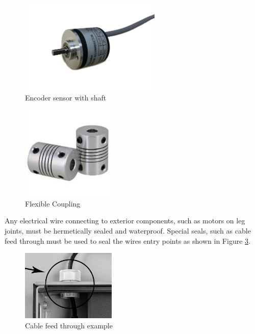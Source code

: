\begin{figure}[H]
    \centering
    \includegraphics[width=0.6\textwidth]{Sections/LiteratureReview/img/electronics/Encoder.jpg}
    \caption{Encoder sensor with shaft \cite{amazon_rotary_nodate}}
    \label{fig:Encoder}
\end{figure}

\begin{figure}[H]
    \centering
    \includegraphics[width=0.4\textwidth]{Sections/LiteratureReview/img/electronics/Shaft_Coupler.jpg}
    \caption{Flexible Coupling \cite{bearings_canada_flexible_nodate}}
    \label{fig:Coupling}
\end{figure}

\mbox{}

Any electrical wire connecting to exterior components, such as  motors on leg joints, must be hermetically sealed and waterproof. Special seals, such as cable feed through must be used to seal the wires entry points as shown in Figure \ref{fig:cable_feedthrough}. 

\begin{figure}[H]
    \centering
    \includegraphics[width=0.4\textwidth]{Sections/LiteratureReview/cables/cable_crossSection.jpg}
    \caption{Cable feed through example \cite{garrett_1605300_nodate}}
    \label{fig:cable_feedthrough}
\end{figure}

